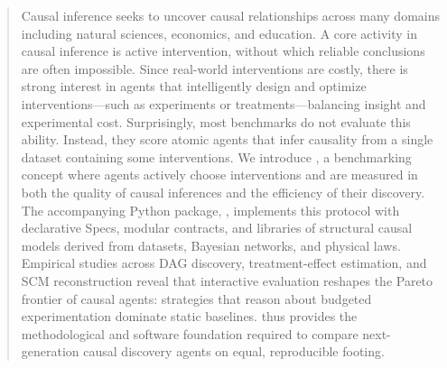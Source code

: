 \begin{abstract}
    Causal inference seeks to uncover causal relationships across many domains including natural sciences, economics, and education.
    A core activity in causal inference is active intervention, without which reliable conclusions are often impossible.
    Since real-world interventions are costly, there is strong interest in agents that intelligently design and optimize interventions—such as experiments or treatments—balancing insight and experimental cost.
    Surprisingly, most benchmarks do not evaluate this ability. Instead, they score atomic agents that infer causality from a single dataset containing some interventions.
    We introduce \game, a benchmarking concept where agents actively choose interventions and are measured in both the quality of causal inferences and the efficiency of their discovery.
    The accompanying Python package, \package, implements this protocol with declarative Specs, modular contracts, and libraries of structural causal models derived from datasets, Bayesian networks, and physical laws.
    Empirical studies across DAG discovery, treatment-effect estimation, and SCM reconstruction reveal that interactive evaluation reshapes the Pareto frontier of causal agents: strategies that reason about budgeted experimentation dominate static baselines.
    \game thus provides the methodological and software foundation required to compare next-generation causal discovery agents on equal, reproducible footing.
\end{abstract}
